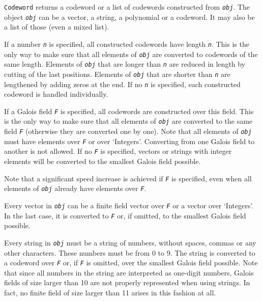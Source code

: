 \documentclass[a4paper,11pt]{report}
\begin{document}
{{{ \texttt{Codeword} returns a codeword or a list of codewords constructed from \mbox{\texttt{\slshape obj}}. The object \mbox{\texttt{\slshape obj}} can be a vector, a string, a polynomial or a codeword. It may also be a list
of those (even a mixed list). 

 If a number \mbox{\texttt{\slshape n}} is specified, all constructed codewords have length \mbox{\texttt{\slshape n}}. This is the only way to make sure that all elements of \mbox{\texttt{\slshape obj}} are converted to codewords of the same length. Elements of \mbox{\texttt{\slshape obj}} that are longer than \mbox{\texttt{\slshape n}} are reduced in length by cutting of the last positions. Elements of \mbox{\texttt{\slshape obj}} that are shorter than \mbox{\texttt{\slshape n}} are lengthened by adding zeros at the end. If no \mbox{\texttt{\slshape n}} is specified, each constructed codeword is handled individually. 

 If a Galois field \mbox{\texttt{\slshape F}} is specified, all codewords are constructed over this field. This is the only
way to make sure that all elements of \mbox{\texttt{\slshape obj}} are converted to the same field \mbox{\texttt{\slshape F}} (otherwise they are converted one by one). Note that all elements of \mbox{\texttt{\slshape obj}} must have elements over \mbox{\texttt{\slshape F}} or over `Integers'. Converting from one Galois field to another is not
allowed. If no \mbox{\texttt{\slshape F}} is specified, vectors or strings with integer elements will be converted to
the smallest Galois field possible. 

 Note that a significant speed increase is achieved if \mbox{\texttt{\slshape F}} is specified, even when all elements of \mbox{\texttt{\slshape obj}} already have elements over \mbox{\texttt{\slshape F}}. 

 Every vector in \mbox{\texttt{\slshape obj}} can be a finite field vector over \mbox{\texttt{\slshape F}} or a vector over `Integers'. In the last case, it is converted to \mbox{\texttt{\slshape F}} or, if omitted, to the smallest Galois field possible. 

 Every string in \mbox{\texttt{\slshape obj}} must be a string of numbers, without spaces, commas or any other characters.
These numbers must be from 0 to 9. The string is converted to a codeword over \mbox{\texttt{\slshape F}} or, if \mbox{\texttt{\slshape F}} is omitted, over the smallest Galois field possible. Note that since all
numbers in the string are interpreted as one-digit numbers, Galois fields of
size larger than 10 are not properly represented when using strings. In fact,
no finite field of size larger than 11 arises in this fashion at all. 

}}}
\end{document}
